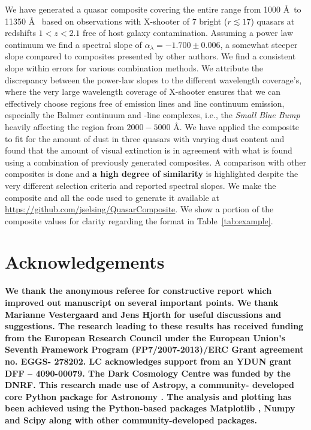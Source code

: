 \documentclass{aa}    %
\newcommand{\Tab}[1]{Table~\ref{tab:#1}}
\newcommand{\tab}[1]{\Tab{#1}}
\newcommand{\sectlabel}[1]{\label{sect:#1}}
\newcommand{\feii}{\ion{Fe}{ii}}
\begin{document}
We have generated a quasar composite covering the entire range from 1000 \AA~to
11350 \AA~ based on observations with X-shooter of 7 bright ($r \lesssim 17$)
quasars at redshifts $1 < z < 2.1$ free of host galaxy contamination. Assuming a
power law continuum we find a spectral slope of $\alpha_\lambda = -1.700 \pm 0.006$, a
somewhat steeper slope compared to composites presented by other authors. We
find a consistent slope within errors for various combination methods. We
attribute the discrepancy between the power-law slopes to the different wavelength
coverage's, where the very large wavelength coverage of X-shooter ensures that we
can effectively choose regions free of emission lines and line continuum
emission, especially the Balmer continuum and \feii-line complexes, i.e., the
\textit{Small Blue Bump} heavily affecting the region from $2000 - 5000$ \AA. We
have applied the composite to fit for the amount of dust in three quasars with
varying dust content and found that the amount of visual extinction is in
agreement with what is found using a combination of previously generated
composites. A comparison with other composites is done and \textbf{a high degree of similarity} is highlighted despite the very different selection criteria and
reported spectral slopes.
We make the composite and all the code used to generate it available at
\url{https://github.com/jselsing/QuasarComposite}. We show a portion of the
composite values for clarity regarding the format in \tab{example}.

 


\section{Acknowledgements}  \sectlabel{Acknowledgements}

\textbf{We thank the anonymous referee for constructive report which improved out manuscript on several important points. We thank Marianne Vestergaard and Jens Hjorth for useful discussions and suggestions. The research leading to these results has received funding from the European Research Council under the European Union’s Seventh Framework Program (FP7/2007-2013)/ERC Grant agreement no. EGGS- 278202. LC acknowledges support from an YDUN grant DFF – 4090-00079. The Dark Cosmology Centre was funded by the DNRF. This research made use of Astropy, a community- developed core Python package for Astronomy \citep{TheAstropyCollaboration2013}. The analysis and plotting has been achieved using the Python-based packages Matplotlib \citep{Hunter2007}, Numpy and Scipy \citep{VanderWalt2011} along with other community-developed packages.}
\end{document}
